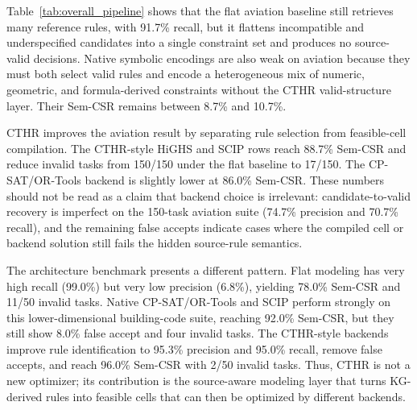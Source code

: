 ﻿\documentclass[a4paper,fleqn]{cas-dc}
\newcommand{\CTHR}{\textsc{CTHR}}
\begin{document}
Table~\ref{tab:overall_pipeline} shows that the flat aviation
baseline still retrieves many reference rules, with 91.7\% recall, but it
flattens incompatible and underspecified candidates into a single constraint
set and produces no source-valid decisions. Native symbolic encodings are also
weak on aviation because they must both select valid rules and encode a
heterogeneous mix of numeric, geometric, and formula-derived constraints
without the \CTHR{} valid-structure layer. Their Sem-CSR remains between
8.7\% and 10.7\%.

\CTHR{} improves the aviation result by separating rule selection from
feasible-cell compilation. The \CTHR{}-style HiGHS and SCIP rows reach 88.7\%
Sem-CSR and reduce invalid tasks from 150/150 under the flat baseline to
17/150. The CP-SAT/OR-Tools backend is slightly lower at 86.0\% Sem-CSR. These
numbers should not be read as a claim that backend choice is irrelevant:
candidate-to-valid recovery is imperfect on the 150-task aviation suite
(74.7\% precision and 70.7\% recall), and the remaining false accepts indicate
cases where the compiled cell or backend solution still fails the hidden
source-rule semantics.

The architecture benchmark presents a different pattern. Flat modeling has
very high recall (99.0\%) but very low precision (6.8\%), yielding 78.0\%
Sem-CSR and 11/50 invalid tasks. Native CP-SAT/OR-Tools and SCIP perform
strongly on this lower-dimensional building-code suite, reaching 92.0\%
Sem-CSR, but they still show 8.0\% false accept and four invalid tasks. The
\CTHR{}-style backends improve rule identification to 95.3\% precision and
95.0\% recall, remove false accepts, and reach 96.0\% Sem-CSR with 2/50 invalid
tasks. Thus, \CTHR{} is not a new optimizer; its contribution is the
source-aware modeling layer that turns KG-derived rules into feasible cells
that can then be optimized by different backends.
\end{document}
